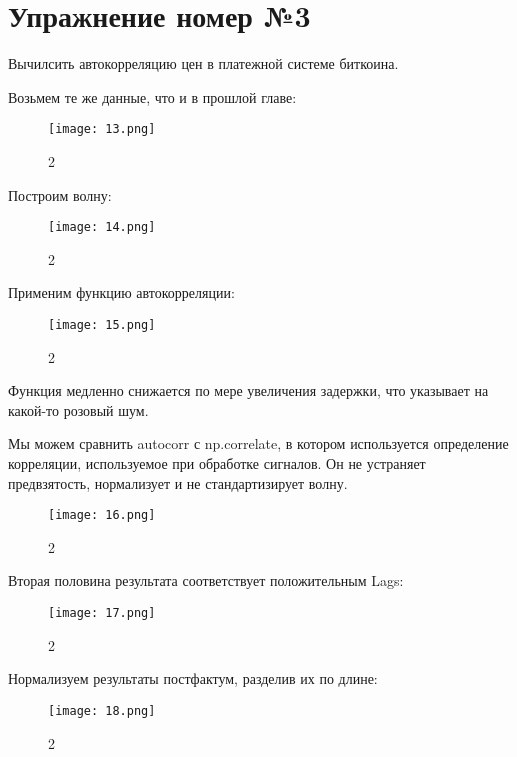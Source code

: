 \documentclass[10pt,a4paper,oneside]{article}
\begin{document}
\section{Упражнение номер №3}

Вычилсить автокорреляцию цен в платежной системе биткоина. 

Возьмем те же данные, что и в прошлой главе: 

\begin{figure}[H]
        \centering
        \texttt{[image: 13.png]}
        \caption{2}
        \label{fig:first}
\end{figure}

Построим волну: 

\begin{figure}[H]
        \centering
        \texttt{[image: 14.png]}
        \caption{2}
        \label{fig:first}
\end{figure}

Применим функцию автокорреляции: 

\begin{figure}[H]
        \centering
        \texttt{[image: 15.png]}
        \caption{2}
        \label{fig:first}
\end{figure}

Функция медленно снижается по мере увеличения задержки, что указывает на какой-то розовый шум.

Мы можем сравнить autocorr с np.correlate, в котором используется определение корреляции, используемое при обработке сигналов. Он не устраняет предвзятость, нормализует и не стандартизирует волну.

\begin{figure}[H]
        \centering
        \texttt{[image: 16.png]}
        \caption{2}
        \label{fig:first}
\end{figure}

Вторая половина результата соответствует положительным Lags:

\begin{figure}[H]
        \centering
        \texttt{[image: 17.png]}
        \caption{2}
        \label{fig:first}
\end{figure}

Нормализуем результаты постфактум, разделив их по длине:

\begin{figure}[H]
        \centering
        \texttt{[image: 18.png]}
        \caption{2}
        \label{fig:first}
\end{figure}
\end{document}
